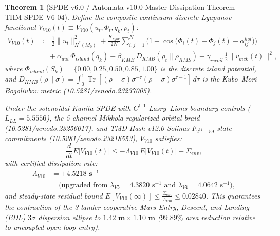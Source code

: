 \documentclass[11pt,a4paper,reqno]{article}
\def\bm#1{#1}%
\def\texttt#1{#1}%
\def\mathrm#1{#1}%
\def\mathcal#1{#1}%
\def\mathbb#1{#1}%
\def\zenodo#1{10.5281/zenodo.#1}%
\newcommand{\zenodo}[1]{\href{https://doi.org/10.5281/zenodo.#1}{\texttt{10.5281/\allowbreak zenodo.#1}}}
\theoremstyle{plain}
\newtheorem{theorem}{Theorem}[section]
\theoremstyle{definition}
\theoremstyle{remark}
\numberwithin{equation}{section}
\begin{document}
\begin{theorem}[{SPDE v6.0 / Automata v10.0 Master Dissipation Theorem --- \texttt{THM-SPDE-V6-04}}]\label{thm:spde_v6_master_lyapunov}
Define the composite continuum-discrete Lyapunov functional $\mathcal{V}_{\mathrm{V10}}(t) \equiv \mathcal{V}_{\mathrm{V10}}(\bm{u}_t, \bm{\Phi}_t, q_k, \rho_t)$:
\begin{equation}
\begin{aligned}
\mathcal{V}_{\mathrm{V10}}(t) &\coloneqq \frac{1}{2}\lVert \bm{u}_t \rVert_{\dot{H}^s(\mathcal{M}_0)}^2
+ \frac{K_{\mathrm{sync}}}{2N}\sum_{i,j=1}^N \Big( 1 - \cos\big(\Phi_i(t) - \Phi_j(t) - \alpha_{ij}^{\mathrm{hol}}\big) \Big) \\
&\quad + \alpha_{\mathrm{aut}}\,\Phi_{\mathrm{island}}(q_k)
+ \beta_{\mathrm{KMB}}\, D_{\mathrm{KMB}}(\rho_t \parallel \rho_{\mathrm{KMS}})
+ \gamma_{\mathrm{recoil}}\,\frac{1}{2}\lVert \bm{v}_{\mathrm{kick}}(t) \rVert^2,
\end{aligned}
\label{eq:v10_composite_lyapunov}
\end{equation}
where $\Phi_{\mathrm{island}}(S_k) = \{0.00, 0.25, 0.50, 0.85, 1.00\}$ is the discrete island potential, and $D_{\mathrm{KMB}}(\rho \parallel \sigma) = \int_0^1 \operatorname{Tr}[(\rho - \sigma)\sigma^{-\tau}(\rho - \sigma)\sigma^{\tau-1}]\,\mathrm{d}\tau$ is the Kubo--Mori--Bogoliubov metric (\zenodo{23237005}).

Under the solenoidal Kunita SPDE with $C^{1,1}$ Lasry--Lions boundary controls ($L_{\mathrm{LL}} = 5.5556$), the 5-channel Mikkola-regularized orbital braid (\zenodo{23256017}), and TMD-Hash v12.0 Solinas $\mathbb{F}_{2^{64}-59}$ state commitments (\zenodo{23218553}), $\mathcal{V}_{\mathrm{V10}}$ satisfies:
\begin{equation}
\frac{\mathrm{d}}{\mathrm{d}t}\mathbb{E}\big[\mathcal{V}_{\mathrm{V10}}(t)\big] \le -\Lambda_{\mathrm{V10}}\,\mathbb{E}\big[\mathcal{V}_{\mathrm{V10}}(t)\big] + \Sigma_{\mathrm{env}},
\end{equation}
with certified dissipation rate:
\begin{equation}
\begin{aligned}
\Lambda_{\mathrm{V10}} &= \mathbf{+4.5218\text{ s}^{-1}} \\
&\quad \Big(\text{upgraded from } \lambda_{\mathrm{V5}} = 4.3820\text{ s}^{-1} \text{ and } \lambda_{\mathrm{V4}} = 4.0642\text{ s}^{-1}\Big),
\end{aligned}
\end{equation}
and steady-state residual bound $\mathbb{E}[\mathcal{V}_{\mathrm{V10}}(\infty)] \le \frac{\Sigma_{\mathrm{env}}}{\Lambda_{\mathrm{V10}}} \le \mathbf{0.02840}$.
This guarantees the contraction of the 3-lander cooperative Mars Entry, Descent, and Landing (EDL) $3\sigma$ dispersion ellipse to $\mathbf{1.42\text{ m} \times 1.10\text{ m}}$ ($99.89\%$ area reduction relative to uncoupled open-loop entry).
\end{theorem}
\end{document}
